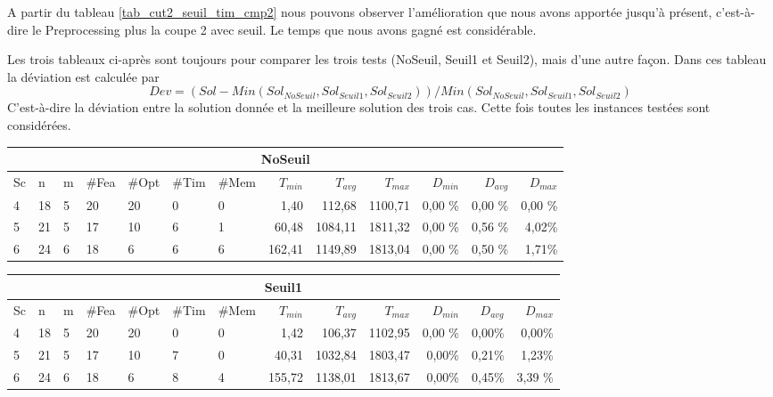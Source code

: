 \documentclass[twoside,fleqn]{EPURapport}
\begin{document}
A partir du tableau \ref{tab_cut2_seuil_tim_cmp2} nous pouvons observer l'amélioration que nous avons apportée jusqu'à présent, c'est-à-dire le Preprocessing plus la coupe 2 avec seuil. Le temps que nous avons gagné est considérable.

Les trois tableaux ci-après sont toujours pour comparer les trois tests (NoSeuil, Seuil1 et Seuil2), mais d'une autre façon. Dans ces tableau la déviation est calculée par $$Dev = (Sol - Min(Sol_{NoSeuil}, Sol_{Seuil1}, Sol_{Seuil2}))/Min(Sol_{NoSeuil}, Sol_{Seuil1}, Sol_{Seuil2})$$C'est-à-dire la déviation entre la solution donnée et la meilleure solution des trois cas. Cette fois toutes les instances testées sont considérées. 
\clearpage
\begin{table}[h]
    \centering
    \begin{tabular}{|l|l|l|l|l|l|l|r|r|r|r|r|r|}
    	\hline
    	\multicolumn{13}{|c|}{NoSeuil}\\ \hline
Sc &	n	&m	&\#Fea	&\#Opt	&\#Tim &\#Mem	&$T_{min}$ & $T_{avg}$	& $T_{max}$ & $D_{min}$ & $D_{avg}$	& $D_{max}$ \\ \hline
4 &	18	&5	&20	    &20	    &0	    & 0	        &1,40	&    112,68	&1100,71	&0,00	    \%&0,00   	\%&0,00   \% \\ \hline
5 &	21	&5	&17	    &10	    &6	    & 1	        &60,48	&1084,11	&1811,32	&0,00	\%&0,56	\%&4,02\% \\ \hline
6 &	24	&6	&18	    &6	    &6	    & 6	        &162,41	&1149,89	&1813,04	&0,00	\%&0,50	\%&1,71\% \\ \hline
    \end{tabular}
    \label{tab_cut2_tab2}
\vspace{2em}
    \begin{tabular}{|l|l|l|l|l|l|l|r|r|r|r|r|r|}
    	\hline
    	\multicolumn{13}{|c|}{Seuil1}\\ \hline
Sc &	n	&m	&\#Fea	&\#Opt	&\#Tim &\#Mem	&$T_{min}$ & $T_{avg}$	& $T_{max}$ & $D_{min}$ & $D_{avg}$	& $D_{max}$ \\ \hline
4&	18&	5&	20&	20&	0&	0&	1,42	&106,37	&1102,95	&0,00 \% &  0,00\%  &  0,00\%     \\ \hline
5&	21&	5&	17&	10&	7&	0&	40,31	&1032,84&	1803,47	&0,00\%	&0,21\%	&1,23\%     \\ \hline
6&	24&	6&	18&	6 &	8&	4&	155,72	&1138,01&	1813,67	&0,00\%	&0,45\%	&3,39  \%     \\ \hline
    \end{tabular}

\end{table}
\end{document}
